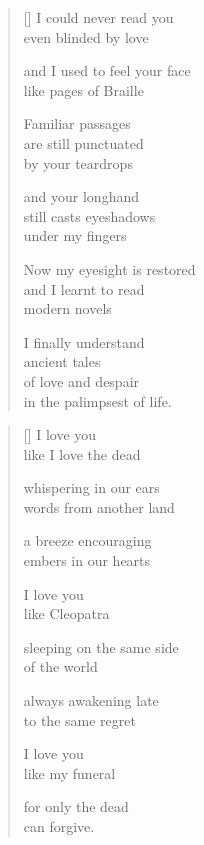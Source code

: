 \documentclass[14pt]{extbook}
\newcommand*{\centeredornament}{\centerline{\pgfornament[width=6cm]{88}}}
\begin{document}
\newpage

\vspace*{-15mm}
\centeredornament
\vspace*{-7mm}


\settowidth{\versewidth}{Now my eyesight is restored}

\begin{verse}[\versewidth]
  I could never read you \\
  even blinded by love

  and I used to feel your face \\
  like pages of Braille

  Familiar passages \\
  are still punctuated \\
  by your teardrops

  and your longhand \\
  still casts eyeshadows \\
  under my fingers

  Now my eyesight is restored \\
  and I learnt to read \\
  modern novels

  I finally understand \\
  ancient tales \\
  of love and despair \\
  in the palimpsest of life.
\end{verse}


\newpage

\vspace*{-15mm}
\centeredornament
\vspace*{-7mm}


\settowidth{\versewidth}{sleeping on the same side}

\begin{verse}[\versewidth]
  I love you \\
  like I love the dead

  whispering in our ears \\
  words from another land

  a breeze encouraging \\
  embers in our hearts

  I love you \\
  like Cleopatra

  sleeping on the same side \\
  of the world

  always awakening late \\
  to the same regret

  I love you \\
  like my funeral

  for only the dead \\
  can forgive.
\end{verse}
\end{document}
